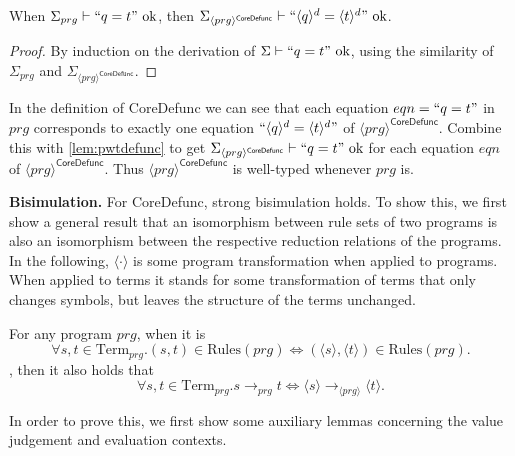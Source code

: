 \begin{lemma}
\label{lem:pwtdefunc}
When $\Sigma_{prg} \vdash `` q = t " \textrm{ ok}$, then $\Sigma_{\langle prg \rangle^{\textsf{CoreDefunc}}} \vdash `` \langle q \rangle^d = \langle t \rangle^d " \textrm{ ok}$.
\begin{proof}
By induction on the derivation of $\Sigma \vdash `` q = t " \textrm{ ok}$, using the similarity of $\Sigma_{prg}$ and $\Sigma_{\langle prg \rangle^{\textsf{CoreDefunc}}}$.
\end{proof}
\end{lemma}

In the definition of \textsf{CoreDefunc} we can see that each equation $eqn = `` q = t "$ in $prg$ corresponds to exactly one equation $`` \langle q \rangle^d = \langle t \rangle^d "$ of $\langle prg \rangle^{\textsf{CoreDefunc}}$. Combine this with \autoref{lem:pwtdefunc} to get $\Sigma_{\langle prg \rangle^{\textsf{CoreDefunc}}} \vdash `` q = t " \textrm{ ok}$ for each equation $eqn$ of $\langle prg \rangle^{\textsf{CoreDefunc}}$. Thus $\langle prg \rangle^{\textsf{CoreDefunc}}$ is well-typed whenever $prg$ is.

\textbf{Bisimulation.} For \textsf{CoreDefunc}, strong bisimulation holds. To show this, we first show a general result that an isomorphism between rule sets of two programs is also an isomorphism between the respective reduction relations of the programs. In the following, $\langle \cdot \rangle$ is some program transformation when applied to programs. When applied to terms it stands for some transformation of terms that only changes symbols, but leaves the structure of the terms unchanged.

\begin{lemma}
\label{lem:iso}
For any program $prg$, when it is
\[
\forall s,t \in \textrm{Term}_{prg}. (s, t) \in \textrm{Rules}(prg) \iff (\langle s \rangle, \langle t \rangle) \in \textrm{Rules}(prg).
\]
, then it also holds that
\[
\forall s,t \in \textrm{Term}_{prg}. s \longrightarrow_{prg} t \iff \langle s \rangle \longrightarrow_{\langle prg \rangle} \langle t \rangle.
\]
\end{lemma}

In order to prove this, we first show some auxiliary lemmas concerning the value judgement and evaluation contexts.

